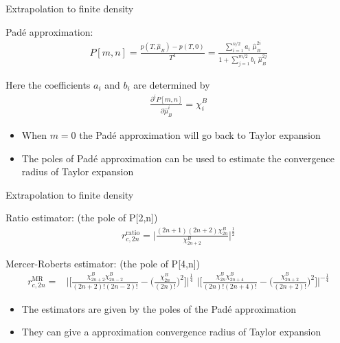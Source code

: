 \begin{frame}[fragile]{Extrapolation to finite density}
    \vspace{-0.2cm}
    \begin{block}{Pad\'{e} approximation:}
        \begin{align}
            P[m,n]=\frac{p(T,\hat{\mu}_B)-p(T,0)}{T^4}=\frac{\sum^{n/2}_{i=1}a_i\,\,\hat{\mu}_B^{2i}}{1+\sum^{m/2}_{j=1}b_i\,\,\hat{\mu}_B^{2j}}
        \end{align}
    \end{block}
    Here the coefficients $a_i$ and $b_i$ are determined by 
    \begin{align}
       \frac{\partial^iP[m,n]}{\partial\hat{\mu}_B^i}=\chi^B_i
    \end{align}
    \begin{itemize}
    \item When $m=0$ the Pad\'{e} approximation will go back to Taylor expansion
    \item The poles of Pad\'{e} approximation can be used to estimate the convergence radius of Taylor expansion
    \end{itemize}
\end{frame}
\begin{frame}[fragile]{Extrapolation to finite density}
    \vspace{-0.2cm}
    \begin{block}{Ratio estimator: (the pole of P[2,n])}
        \begin{align}
            r^{\mathrm{ratio}}_{c,2n}=\bigg| \frac{(2n+1)(2n+2)\chi^B_{2n}}{\chi^B_{2n+2}} \bigg|^{\frac{1}{2}}
        \end{align}
    \end{block}
    \begin{block}{Mercer-Roberts estimator: (the pole of P[4,n])}
    \begin{align}
            r^{\mathrm{MR}}_{c,2n}=&\bigg|\bigg[ \frac{\chi^B_{2n+2}\chi^B_{2n-2}}{(2n+2)!(2n-2)!}-\bigg(\frac{\chi^B_{2n}}{(2n)!}\bigg)^2 \bigg]\bigg|^{\frac{1}{4}}\,\,\bigg|\bigg[ \frac{\chi^B_{2n}\chi^B_{2n+4}}{(2n)!(2n+4)!}-\bigg(\frac{\chi^B_{2n+2}}{(2n+2)!}\bigg)^2 \bigg]\bigg|^{-\frac{1}{4}}
    \end{align}
    \end{block}
    \vspace{0.5cm}
    \begin{itemize}
    \item The estimators are given by the poles of the Pad\'{e} approximation 
    \item They can give a approximation convergence radius of Taylor expansion
    \end{itemize}
\end{frame}
